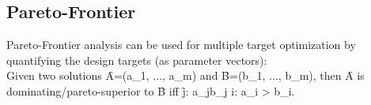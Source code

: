 \subsection{Pareto-Frontier}
Pareto-Frontier analysis can be used for multiple target optimization by quantifying the design targets (as parameter vectors):\\[0.5em]
Given two solutions \f{A=(a_1, ..., a_m)} and \f{B=(b_1, ..., b_m)}, then \f{A} is dominating/pareto-superior to \f{B} iff \f{\forall j: a_j\geq b_j \wedge \exists i: a_i > b_i}. 

